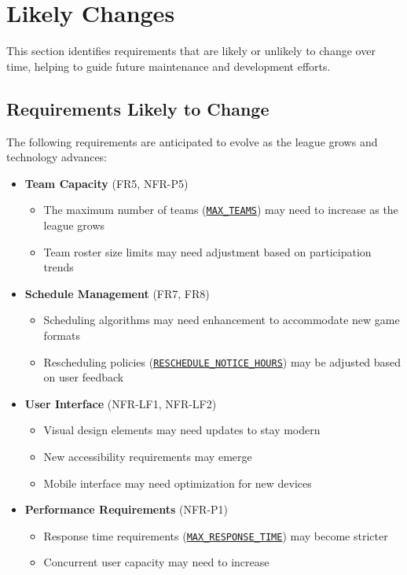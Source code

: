 \documentclass[12pt, titlepage]{article}
\begin{document}
\section{Likely Changes}
This section identifies requirements that are likely or unlikely to change over time, helping to guide future maintenance and development efforts.

\subsection{Requirements Likely to Change}
The following requirements are anticipated to evolve as the league grows and technology advances:

\begin{itemize}
    \item \textbf{Team Capacity} (FR5, NFR-P5)
    \begin{itemize}
        \item The maximum number of teams (\hyperref[MAX_TEAMS]{\texttt{MAX\_TEAMS}}) may need to increase as the league grows
        \item Team roster size limits may need adjustment based on participation trends
    \end{itemize}

    \item \textbf{Schedule Management} (FR7, FR8)
    \begin{itemize}
        \item Scheduling algorithms may need enhancement to accommodate new game formats
        \item Rescheduling policies (\hyperref[RESCHEDULE_NOTICE_HOURS]{\texttt{RESCHEDULE\_NOTICE\_HOURS}}) may be adjusted based on user feedback
    \end{itemize}

    \item \textbf{User Interface} (NFR-LF1, NFR-LF2)
    \begin{itemize}
        \item Visual design elements may need updates to stay modern
        \item New accessibility requirements may emerge
        \item Mobile interface may need optimization for new devices
    \end{itemize}

    \item \textbf{Performance Requirements} (NFR-P1)
    \begin{itemize}
        \item Response time requirements (\hyperref[MAX_RESPONSE_TIME]{\texttt{MAX\_RESPONSE\_TIME}}) may become stricter
        \item Concurrent user capacity may need to increase
    \end{itemize}


\end{itemize}
\end{document}
